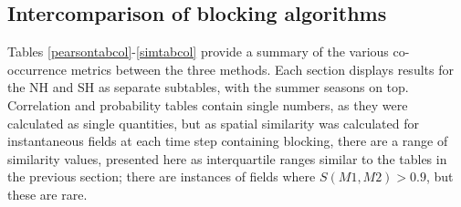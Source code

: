 \documentclass[smallextended]{svjour3}       %
\numberwithin{equation}{section}
\begin{document}
\subsection{Intercomparison of blocking algorithms}\label{intercompare}

Tables \ref{pearsontabcol}-\ref{simtabcol} provide a summary of the various co-occurrence metrics between the three methods. Each section displays results for the NH and SH as separate subtables, with the summer seasons on top. Correlation and probability tables contain single numbers, as they were calculated as single quantities, but as spatial similarity was calculated for instantaneous fields at each time step containing blocking, there are a range of similarity values, presented here as interquartile ranges similar to the tables in the previous section; there are instances of fields where $S(M1,M2)>0.9$, but these are rare. 
\end{document}
